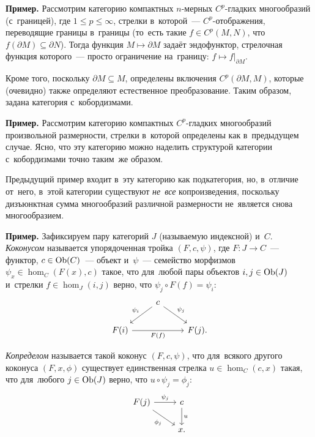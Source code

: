 \documentclass[a4paper,oneside]{article}
\begin{document}
\medskip
\noindent\textbf{Пример.} Рассмотрим категорию компактных $n$-мерных $C^p$-гладких многообразий (с~границей),
где $1 \leq p \leq \infty$, стрелки в~которой~— $C^p$-отображения, переводящие границы в~границы (то~есть такие $f \in C^p(M, N)$,
что $f(\partial M) \subseteq \partial N$). Тогда функция $M \mapsto \partial M$ задаёт эндофунктор,
стрелочная функция которого~— просто ограничение на~границу: $f \mapsto f|_{\partial M}$.

Кроме того, поскольку $\partial M \subseteq M$, определены включения $C^p(\partial M, M)$,
которые (очевидно) также определяют естественное преобразование. Таким образом, задана категория с~кобордизмами.
\medskip

\noindent\textbf{Пример.} Рассмотрим категорию компактных $C^p$-гладких многообразий произвольной размерности,
стрелки в~которой определены как в~предыдущем случае. Ясно, что эту категорию можно наделить структурой
категории с~кобордизмами точно таким~же образом.

Предыдущий пример входит в~эту категорию как подкатегория, но, в~отличие от~него, в~этой категории
существуют \textit{не~все} копроизведения, поскольку дизъюнктная сумма многообразий различной размерности
не~является снова многообразием.
\medskip

\noindent\textbf{Пример.} Зафиксируем пару категорий $J$ (называемую индексной) и~$C$. \textit{Коконусом} называется упорядоченная
тройка $(F, c, \psi)$, где $F : J \rightarrow C$~— функтор, $c \in \mathrm{Ob}(C)$~— объект
и~$\psi$~— семейство морфизмов $\psi_x \in \hom_C(F(x), c)$ такое, что для~любой
пары объектов $i, j \in \mathrm{Ob}(J)$ и~стрелки $f \in \hom_J(i, j)$ верно,
что $\psi_j \circ F(f) = \psi_i$:
\[
  \begin{tikzcd}
    &                               & \arrow{ld}{}[swap]{\psi_i} c \arrow{rd}{\psi_j} &       & \\
    & F(i) \arrow{rr}{}[swap]{F(f)} &                                                 & F(j). &
  \end{tikzcd}
\]

\textit{Копределом} называется такой коконус $(F, c, \psi)$, что для~всякого другого коконуса $(F, x, \phi)$
существует единственная стрелка $u \in \hom_C(c, x)$ такая, что для~любого $j \in \mathrm{Ob}(J)$
верно, что $u \circ \psi_j = \phi_j$:
\[
  \begin{tikzcd}
    F(j) \arrow{r}{\psi_j} \arrow{dr}{}[swap]{\phi_j} & \arrow{d}{u} c \\
                                                      & x.
  \end{tikzcd}
\]
\end{document}
